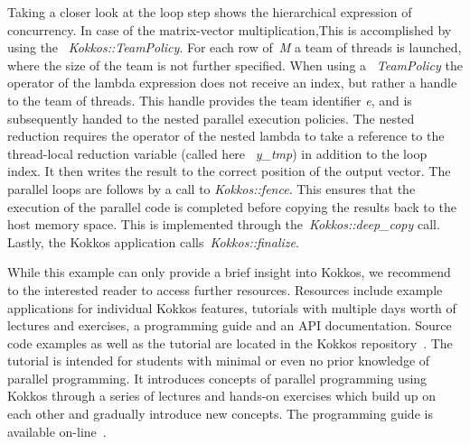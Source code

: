 Taking a closer look at the loop step shows the hierarchical expression of concurrency. In case of the matrix-vector multiplication,This is accomplished by using the ~\emph{Kokkos::TeamPolicy}. For each row of~\emph{M} a team of threads is launched, where the size of the team is not further specified. When using a ~\emph{TeamPolicy} the operator of the lambda expression does not receive an index, but rather a handle to the team of threads. 
This handle provides the team identifier \emph{e}, and is subsequently handed to the nested parallel execution policies. The nested reduction requires the operator of the nested lambda to take a reference to the thread-local reduction variable (called here ~\emph{y\_tmp}) in addition to the loop index. It then writes the result to the correct position of the output vector. 
The parallel loops are follows by a call to \emph{Kokkos::fence}. This ensures that the execution of the parallel code is completed before copying the results back to the host memory space. This is implemented through the~\emph{Kokkos::deep\_copy} call. Lastly, the Kokkos application calls~\emph{Kokkos::finalize}.

While this example can only provide a brief insight into Kokkos, we recommend to the interested reader to access further resources. Resources include example applications for individual Kokkos features, tutorials with multiple days worth of lectures and exercises, a programming guide and an API documentation. Source code examples as well as the tutorial are located in the Kokkos repository~\cite{KOKKOS_REPO}. The tutorial is intended for students with minimal or even no prior knowledge of parallel programming. It introduces concepts of parallel programming using Kokkos through a series of lectures and hands-on exercises which build up on each other and gradually introduce new concepts. The programming guide is available on-line~\cite{KOKKOS_WIKI}. 

